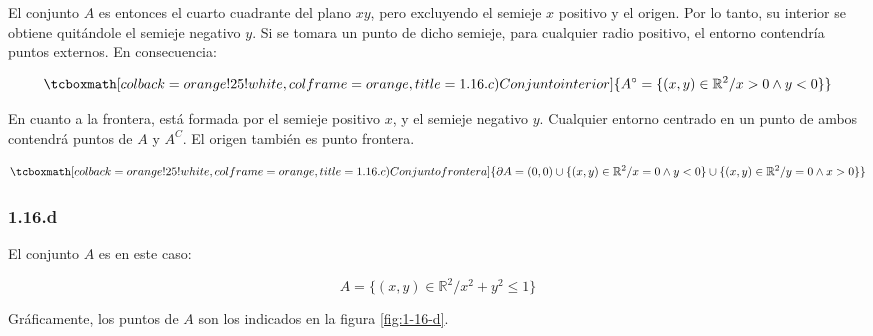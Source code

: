 \documentclass{article}
\renewcommand{\Bbb}{\mathbb}
\begin{document}
El conjunto $A$ es entonces el cuarto cuadrante del plano $xy$, pero excluyendo el semieje $x$ positivo y el origen. Por lo tanto, su interior se obtiene quitándole el semieje negativo $y$. Si se tomara un punto de dicho semieje, para cualquier radio positivo, el entorno contendría puntos externos. En consecuencia:

\begin{equation}
\tcboxmath[colback=orange!25!white,colframe=orange, title=1.16.c) Conjunto interior]
{ A^{\circ} = \{ (x, y) \in \Bbb R^2 / x > 0 \wedge y < 0 \}  }
\end{equation}

En cuanto a la frontera, está formada por el semieje positivo $x$, y el semieje negativo $y$. Cualquier entorno centrado en un punto de ambos contendrá puntos de $A$ y $A^C$. El origen también es punto frontera.

\begin{equation}
\tcboxmath[colback=orange!25!white,colframe=orange, title=1.16.c) Conjunto frontera]
{ \partial{A} = (0,0) \cup \{ (x, y) \in \Bbb R^2 / x = 0 \wedge y < 0 \} \cup \{ (x, y) \in \Bbb R^2 / y = 0 \wedge x > 0 \} }
\end{equation}

\subsubsection*{1.16.d}
\label{subsubsec:1.16.d}

El conjunto $A$ es en este caso:

\begin{equation}
A = \{ (x,y) \in \Bbb R^2 / x^2 + y^2 \leq 1 \}
\end{equation}

Gráficamente, los puntos de $A$ son los indicados en la figura \ref{fig:1-16-d}.
\end{document}
